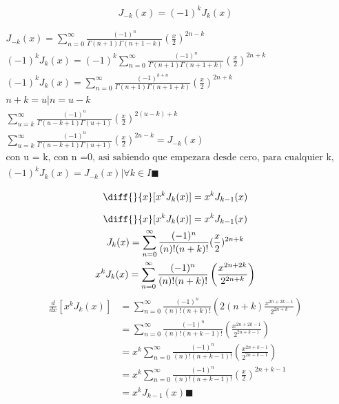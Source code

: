 

\begin{prob}
 $$J_{-k}(x)= (-1)^k J_{k}(x)$$

\end{prob}
\begin{mdframed}
\begin{gather*}
    J_{-k}(x) = \sum_{n=0}^\infty \frac{(-1)^n}{\Gamma(n+1)\Gamma(n+1-k)}(\frac{x}{2})^{2n-k}\\
    (-1)^k J_{k}(x) =  (-1)^k \sum_{n=0}^\infty \frac{(-1)^n}{\Gamma(n+1)\Gamma(n+1+k)}(\frac{x}{2})^{2n+k}\\
     (-1)^k J_{k}(x) =  \sum_{n=0}^\infty \frac{(-1)^{k+n}}{\Gamma(n+1)\Gamma(n+1+k)}(\frac{x}{2})^{2n+k}\\
    n +k =u | n = u -k\\
     \sum_{u=k}^\infty \frac{(-1)^{u}}{\Gamma(u-k+1)\Gamma(u+1)}(\frac{x}{2})^{2(u-k)+k}\\
     \sum_{u=k}^\infty \frac{(-1)^{u}}{\Gamma(u-k+1)\Gamma(u+1)}(\frac{x}{2})^{2u-k} =  J_{-k}(x)\\
     \text{con u = k, con n =0, asi sabiendo que empezara desde cero, para cualquier k, mayor o igual que cero} \\
     (-1)^k J_{k}(x)= J_{-k}(x) | \forall k \in I\blacksquare
\end{gather*}
\end{mdframed}
\begin{prob}
     $$\diff{}{x}[x^kJ_{k}(x)] = x^k J_{k-1}(x)$$
\end{prob}
\begin{mdframed}
\begin{gather*}
      \diff{}{x}[x^kJ_{k}(x)] = x^k J_{k-1}(x) \\
    J_{k}(x) =\sum_{n=0}^\infty \frac{(-1)^n}{(n)!(n+k)!}(\frac{x}{2})^{2n+k}\\
    x^kJ_{k}(x)  =\sum_{n=0}^\infty \frac{(-1)^n}{(n)!(n+k)!}\left(\frac{x^{2n+2k}}{2^{2n+k}}\right)\\
\end{gather*}
\begin{align*}
    \frac{d}{dx}\left[x^kJ_{k}(x)\right] & =\sum_{n=0}^\infty \frac{(-1)^n}{(n)!(n+k)!}\left(2(n+k)\frac{x^{2n+2k-1}}{2^{2n+k}}\right)\\
    & =\sum_{n=0}^\infty \frac{(-1)^n}{(n)!(n+k-1)!}\left(\frac{x^{2n+2k-1}}{2^{2n+k-1}}\right)\\
    & =x^k\sum_{n=0}^\infty \frac{(-1)^n}{(n)!(n+k-1)!}\left(\frac{x^{2n+k-1}}{2^{2n+k-1}}\right)\\
    & =x^k\sum_{n=0}^\infty \frac{(-1)^n}{(n)!(n+k-1)!}\left(\frac{x}{2}\right)^{2n+k-1}\\
    & =x^kJ_{k-1}(x) \blacksquare
\end{align*}

\end{mdframed}
